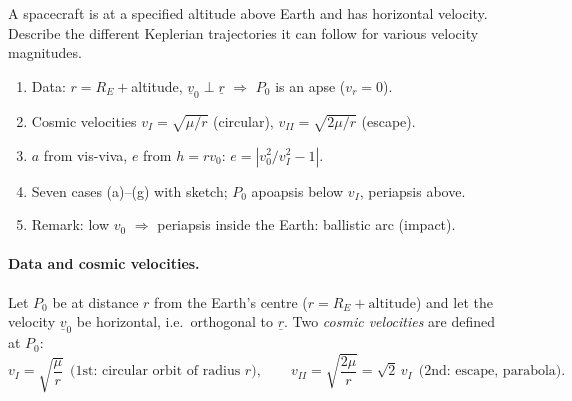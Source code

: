 
\begin{qbox}
A spacecraft is at a specified altitude above Earth and has horizontal velocity. Describe the different Keplerian
trajectories it can follow for various velocity magnitudes.
\end{qbox}

\begin{outline}
\begin{enumerate}
\item Data: $r=R_E+$altitude, $\underline v_0\perp\underline r$ $\Rightarrow$ $P_0$ is an apse ($v_r=0$).
\item Cosmic velocities $v_I=\sqrt{\mu/r}$ (circular), $v_{II}=\sqrt{2\mu/r}$ (escape).
\item $a$ from vis-viva, $e$ from $h=rv_0$: $e=|v_0^2/v_I^2-1|$.
\item Seven cases (a)--(g) with sketch; $P_0$ apoapsis below $v_I$, periapsis above.
\item Remark: low $v_0$ $\Rightarrow$ periapsis inside the Earth: ballistic arc (impact).
\end{enumerate}
\end{outline}

\answer
\paragraph{Data and cosmic velocities.} Let $P_0$ be at distance $r$ from the Earth's centre ($r=R_E+\text{altitude}$) and let
the velocity $\underline v_0$ be horizontal, i.e.\ orthogonal to $\underline r$. Two \emph{cosmic velocities} are defined at $P_0$:
\begin{equation}
v_I=\sqrt{\frac{\mu}{r}}\ \ \text{(1st: circular orbit of radius $r$)},\qquad
v_{II}=\sqrt{\frac{2\mu}{r}}=\sqrt2\,v_I\ \ \text{(2nd: escape, parabola)}.
\end{equation}

